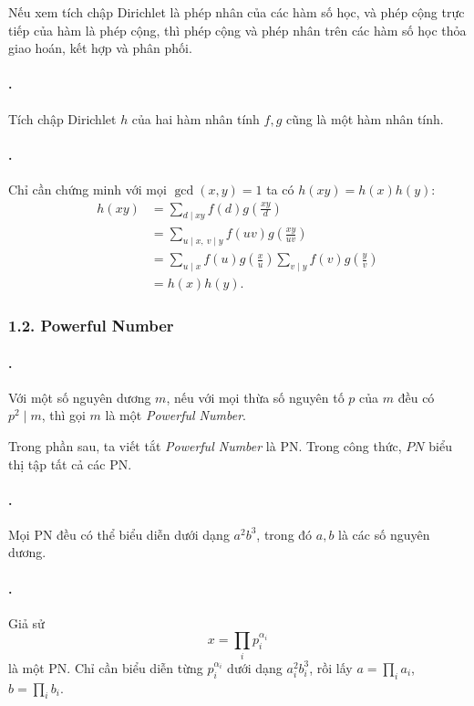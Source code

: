 \documentclass[11pt]{article}
\begin{document}
Nếu xem tích chập Dirichlet là phép nhân của các hàm số học, và phép cộng trực
tiếp của hàm là phép cộng, thì phép cộng và phép nhân trên các hàm số học thỏa
giao hoán, kết hợp và phân phối.

\paragraph{.}
Tích chập Dirichlet \(h\) của hai hàm nhân tính \(f,g\) cũng là một hàm nhân
tính.

\paragraph{.}
Chỉ cần chứng minh với mọi \(\gcd(x,y)=1\) ta có \(h(xy)=h(x)h(y)\):
\[
\begin{aligned}
  h(xy)
  &= \sum_{d\mid xy} f(d)g\left(\frac{xy}{d}\right) \\
  &= \sum_{u\mid x,\ v\mid y} f(uv)g\left(\frac{xy}{uv}\right) \\
  &= \sum_{u\mid x} f(u)g\left(\frac{x}{u}\right)
     \sum_{v\mid y} f(v)g\left(\frac{y}{v}\right) \\
  &= h(x)h(y).
\end{aligned}
\]

\subsubsection*{1.2. Powerful Number}

\paragraph{.}
Với một số nguyên dương \(m\), nếu với mọi thừa số nguyên tố \(p\) của \(m\) đều
có \(p^2\mid m\), thì gọi \(m\) là một \emph{Powerful Number}.

Trong phần sau, ta viết tắt \emph{Powerful Number} là PN. Trong công thức,
\(PN\) biểu thị tập tất cả các PN.

\paragraph{.}
Mọi PN đều có thể biểu diễn dưới dạng \(a^2b^3\), trong đó \(a,b\) là các số
nguyên dương.

\paragraph{.}
Giả sử
\[
  x=\prod_i p_i^{\alpha_i}
\]
là một PN. Chỉ cần biểu diễn từng \(p_i^{\alpha_i}\) dưới dạng
\(a_i^2b_i^3\), rồi lấy \(a=\prod_i a_i\), \(b=\prod_i b_i\).
\end{document}
